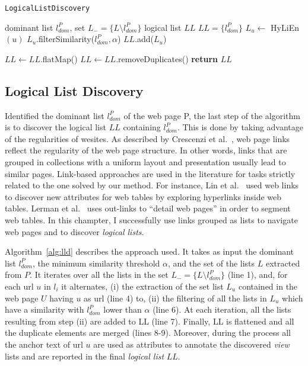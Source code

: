 \begin{algorithm}
\caption{\texttt{LogicalListDiscovery}}\label{alg:lld}

\begin{algorithmic}[1]
\renewcommand{\algorithmicrequire}{\textbf{Input:}}
\renewcommand{\algorithmicensure}{\textbf{Output:}}

\REQUIRE dominant list $l_{dom}^P$, set $L_{-}=\{L \setminus l_{dom}^P\}$
\ENSURE logical list $LL$
\STATE $LL = \{l_{dom}^P\}$
		\STATE $L_u \gets$ HyLiEn$(u)$
		\STATE $L_u$.filterSimilarity($l_{dom}^P,\alpha$)%
		\STATE $LL$.add($L_u$)%
		\ENDFOR
		\ENDFOR

\STATE $LL \gets LL.$flatMap()%
\STATE $LL \gets LL$.removeDuplicates()%
\STATE \textbf{return} $LL$%
		
\end{algorithmic}
\end{algorithm}

\subsection{Logical List Discovery}
Identified the dominant list $l_{dom}^P$ of the web page P, the last step of the algorithm is to discover the logical list $LL$ containing $l_{dom}^P$. This is done by taking advantage of the regularities of wesites. As described by Crescenzi et al.~\cite{Crescenzi:2005}, web page links reflect the regularity of the web page structure. In other words, links that are grouped in collections with a uniform layout and presentation usually lead to similar pages. Link-based approaches are used in the literature for tasks strictly related to the one solved by our method. For instance, Lin et al.~\cite{Lin:2010} used web links to discover new attributes for web tables by exploring hyperlinks inside web tables. Lerman et al.~\cite{Lerman2004} uses out-links to ``detail web pages'' in order to segment web tables. In this champter, I successfully use links grouped as lists to navigate web pages and to discover \textit{logical lists}.
\color{black}

Algorithm~\ref{alg:lld} describes the approach used. It takes as input the dominant list $l_{dom}^P$, the minimum similarity threshold $\alpha$, and the set of the lists $L$ extracted from $P$. It iterates over all the lists in the set $L_{-}=\{L \setminus l_{dom}^P\}$ (line 1), and, for each url $u$ in $l_i$ it alternates, (i) the extraction of the set list $L_u$ contained in the web page $U$ having $u$ as url (line 4) to, (ii) the filtering of all the lists in $L_u$ which have a similarity with $l_{dom}^P$ lower than $\alpha$ (line 6). At each iteration, all the lists resulting from step (ii) are added to LL (line 7). Finally, LL is flattened and all the duplicate elements are merged (lines 8-9). 
Moreover, during the process all the anchor text of url $u$ are used as attributes to annotate the discovered \emph{view} lists and are reported in the final \emph{logical list} $LL$.
